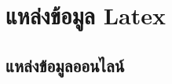 \documentclass[thesis.tex]{subfiles}
\begin{document}
\chapter{แหล่งข้อมูล Latex}
\section{แหล่งข้อมูลออนไลน์}
\end{document}
